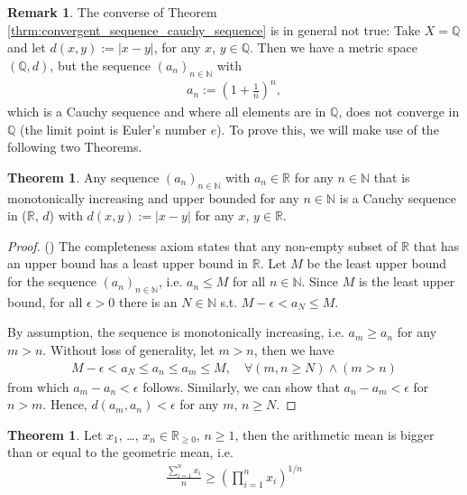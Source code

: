 \documentclass[12pt, a4paper]{article}
\numberwithin{equation}{section}
\theoremstyle{definition}
\theoremstyle{definition}
\newtheorem{remark}[thm]{Remark} %
\newtheorem{theorem}[thm]{Theorem}
\newcommand{\abs}[1]{\left\vert #1 \right\vert}
\begin{document}
	\begin{remark}\label{remark:cauchy_not_convergent_necess}
		The converse of Theorem \ref{thrm:convergent_sequence_cauchy_sequence} is in general not true: Take $X=\mathbb Q$ and let $d(x, y) := \abs{x - y}$, for any $x$, $y\in\mathbb Q$. Then we have a metric space $(\mathbb Q, d)$, but the sequence $(a_n)_{n\in\mathbb N}$ with
		\begin{align}\label{eq:seq_euler}
			a_n := \left(1 + \frac{1}{n}\right)^n,
		\end{align}
		which is a Cauchy sequence and where all elements are in $\mathbb Q$, does not converge in $\mathbb Q$ (the limit point is Euler's number $e$). To prove this, we will make use of the following two Theorems.
	\end{remark}
	
	\begin{theorem}\label{thrm:mono_inc_seq_Cauchy}
		Any sequence $(a_n)_{n\in\mathbb N}$ with $a_n\in \mathbb R$ for any $n\in \mathbb N$ that is monotonically increasing and upper bounded for any $n\in\mathbb N$ is a Cauchy sequence in ($\mathbb R$, $d$) with $d(x, y):= \abs{x - y}$ for any $x$, $y\in \mathbb R$.		
	\end{theorem}

	\begin{proof}(\cite{2169936})
		The completeness axiom states that any non-empty subset of $\mathbb R$ that has an upper bound has a least upper bound in $\mathbb R$. Let $M$ be the least upper bound for the sequence $(a_n)_{n\in\mathbb N}$, i.e. $a_n \leq M$ for all $n\in\mathbb N$. Since $M$ is the least upper bound, for all $\epsilon > 0$ there is an $N\in\mathbb N$ s.t. $M - \epsilon < a_N \leq M$.
		
		By assumption, the sequence is monotonically increasing, i.e. $a_m \geq a_n$ for any $m > n$. Without loss of generality, let $m > n$, then we have
		\begin{align}\label{eq:mono_inc_seq_Cauchy}
			M - \epsilon < a_N \leq a_n \leq a_m \leq M, \quad \forall (m, n\geq N) \wedge (m > n)
		\end{align}
		from which $a_m - a_n < \epsilon$ follows. Similarly, we can show that $a_n - a_m < \epsilon$ for $n > m$. Hence, $d(a_m, a_n) < \epsilon$ for any $m$, $n\geq N$.
	\end{proof}
	
	\begin{theorem}\label{thrm:AM-GM}
		Let $x_1$, \dots, $x_n\in\mathbb R_{\geq 0}$, $n\geq 1$, then the arithmetic mean is bigger than or equal to the geometric mean, i.e.
		\begin{align}\label{eq:AM-GM}
			\frac{\sum_{i=1}^{n} x_i}{n} \geq \left(\prod_{i=1}^{n}x_i\right)^{1/n}
		\end{align}
	\end{theorem}
	
\end{document}
